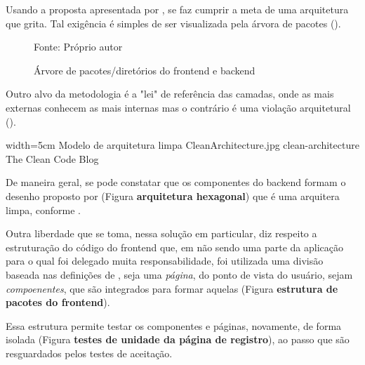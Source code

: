  Usando a proposta apresentada por , se faz cumprir a meta de uma arquitetura que grita. Tal exigência é simples de ser visualizada pela árvora de pacotes ().

  \begin{figure}[h]
    \centering
    \caption{Árvore de pacotes/diretórios do frontend e backend}
    Fonte: Próprio autor
    \label{fig:testes-de-integracao-api-e-repositorio}
  \end{figure}

  Outro alvo da metodologia é a "lei" de referência das camadas, onde as mais externas conhecem as mais internas mas o contrário é uma violação arquitetural ().

  \imagem
    {width=5cm}
    {Modelo de arquitetura limpa}
    {CleanArchitecture.jpg}
    {clean-architecture}
    {The Clean Code Blog\footnotemark}

  De maneira geral, se pode constatar que os componentes do backend formam o desenho proposto por  (Figura \textbf{arquitetura hexagonal}) que é uma arquitera limpa, conforme .

  Outra liberdade que se toma, nessa solução em particular, diz respeito a estruturação do código do frontend que, em não sendo uma parte da aplicação para o qual foi delegado muita responsabilidade, foi utilizada uma divisão baseada nas definições de , seja uma \emph{página}, do ponto de vista do usuário, sejam \emph{compoenentes}, que são integrados para formar aquelas (Figura \textbf{estrutura de pacotes do frontend}).

  Essa estrutura permite testar os componentes e páginas, novamente, de forma isolada (Figura \textbf{testes de unidade da página de registro}), ao passo que são resguardados pelos testes de aceitação.
